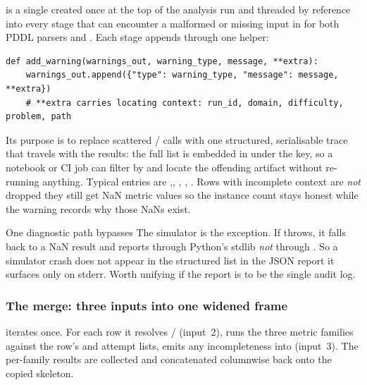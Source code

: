  is a single  created once at the top of the
analysis run and threaded by reference into every stage that can encounter a
malformed or missing input in  for both PDDL parsers and
. Each stage appends through one helper:

\begin{lstlisting}
def add_warning(warnings_out, warning_type, message, **extra):
    warnings_out.append({"type": warning_type, "message": message, **extra})
    # **extra carries locating context: run_id, domain, difficulty, problem, path
\end{lstlisting}

Its purpose is to replace scattered / calls with one
structured, serialisable trace that travels with the results: the full list is
embedded in  under the  key, so a notebook or CI
job can filter by  and locate the offending artifact without
re-running anything. Typical entries are ,, ,
, . Rows with incomplete context are \emph{not} dropped they still get NaN metric values so the
instance count stays honest while the warning records why those NaNs exist.

\begin{bmcavbox}{One diagnostic path bypasses }
The simulator is the exception. If  throws, it
falls back to a NaN result and reports through Python's stdlib
 \emph{not} through
. So a simulator crash does not appear in the structured
 list in the JSON report it surfaces only on stderr. Worth
unifying if the report is to be the single audit log.
\end{bmcavbox}

\subsubsection{The merge: three inputs into one widened frame}

 iterates  once. For each row it resolves
/ (input~2), runs the three metric families against the
row's  and attempt lists, emits any incompleteness into
 (input~3). The per-family results are collected and
concatenated columnwise back onto the copied skeleton.

